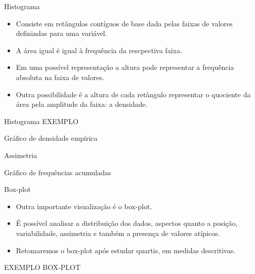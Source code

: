 \documentclass[
  ignorenonframetext,
  serif,
  professionalfont,
  usenames,
  dvipsnames,
  aspectratio = 169]{beamer}
\providecommand{\tightlist}{%
  \setlength{\itemsep}{0pt}\setlength{\parskip}{0pt}}
\renewcommand{\tightlist}{%
  \setlength{\itemsep}{0\baselineskip}
  \setlength{\parskip}{0.25\baselineskip}
}
\begin{document}
\begin{frame}{Histograma}
\protect\hypertarget{histograma}{}
\begin{itemize}
\tightlist
\item
  Consiste em retângulos contíguos de base dada pelas faixas de valores
  definindas para uma variável.
\item
  A área igual é igual à frequência da rescpectiva faixa.
\item
  Em uma possível representação a altura pode representar a frequência
  absoluta na faixa de valores.
\item
  Outra possibilidade é a altura de cada retângulo representar o
  quociente da área pela amplitude da faixa: a densidade.
\end{itemize}
\end{frame}

\begin{frame}{Histograma}
\protect\hypertarget{histograma-1}{}
EXEMPLO
\end{frame}

\begin{frame}{Gráfico de densidade empírica}
\protect\hypertarget{gruxe1fico-de-densidade-empuxedrica}{}
\end{frame}

\begin{frame}{Assimetria}
\protect\hypertarget{assimetria}{}
\end{frame}

\begin{frame}{Gráfico de frequências acumuladas}
\protect\hypertarget{gruxe1fico-de-frequuxeancias-acumuladas}{}
\end{frame}

\begin{frame}{Box-plot}
\protect\hypertarget{box-plot}{}
\begin{itemize}
\item
  Outra importante visualização é o box-plot.
\item
  É possível analisar a distribuição dos dados, aspectos quanto a
  posição, variabilidade, assimetria e também a presença de valores
  atípicos.
\item
  Retomaremos o box-plot após estudar quartis, em medidas descritivas.
\end{itemize}

EXEMPLO BOX-PLOT
\end{frame}
\end{document}
